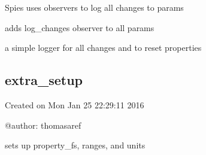 \documentclass[letterpaper,10pt,english]{sphinxmanual}
\begin{document}

\begin{fulllineitems}
\label{core_doc/agent:taref.core.agent.Spy}
Spies uses observers to log all changes to params

\begin{fulllineitems}
\label{core_doc/agent:taref.core.agent.Spy.base_name}
\end{fulllineitems}


\begin{fulllineitems}
\label{core_doc/agent:taref.core.agent.Spy.extra_setup}
adds log\_changes observer to all params

\end{fulllineitems}


\begin{fulllineitems}
\label{core_doc/agent:taref.core.agent.Spy.log_changes}
a simple logger for all changes and to reset properties

\end{fulllineitems}


\end{fulllineitems}



\subsection{extra\_setup}
\label{core_doc/extra_setup::doc}\label{core_doc/extra_setup:module-taref.core.extra_setup}\label{core_doc/extra_setup:extra-setup}
Created on Mon Jan 25 22:29:11 2016

@author: thomasaref

\begin{fulllineitems}
\label{core_doc/extra_setup:taref.core.extra_setup.extra_setup}
sets up property\_fs, ranges, and units

\end{fulllineitems}
\end{document}
